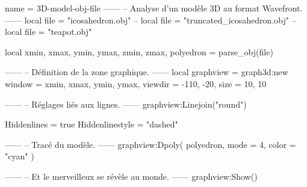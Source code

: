\documentclass{standalone}
\begin{document}
\begin{luadraw}{name = 3D-model-obj-file}
------
-- Analyse d'un modèle 3D au format Wavefront.
------
local file = "icosahedron.obj"
-- local file = "truncated_icosahedron.obj"
-- local file = "teapot.obj"

local xmin, xmax, ymin, ymax, zmin, zmax, polyedron = parse_obj(file)

------
-- Définition de la zone graphique.
------
local graphview = graph3d:new{
  window  = {xmin, xmax, ymin, ymax},
  viewdir = {-110, -20},
  size    = {10, 10}
}

------
-- Réglages liés aux lignes.
------
graphview:Linejoin("round")

Hiddenlines     = true
Hiddenlinestyle = "dashed"

------
-- Tracé du modèle.
------
graphview:Dpoly(
  polyedron,
  {
    mode  = 4,
    color = "cyan"
  })

------
-- Et le merveilleux se révèle au monde.
------
graphview:Show()
\end{luadraw}
\end{document}
